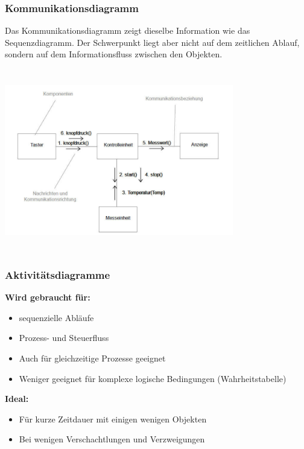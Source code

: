 \newpage
\subsubsection{Kommunikationsdiagramm}
Das Kommunikationsdiagramm zeigt dieselbe Information wie das Sequenzdiagramm. Der Schwerpunkt liegt aber
nicht auf dem zeitlichen Ablauf, sondern auf dem Informationsfluss zwischen den Objekten.

\includegraphics[height=8cm, width = 10cm,]{images/Modellierung/Kommunikationsdiagramm}


\subsubsection{Aktivitätsdiagramme}

\begin{multicols}{2}
	\textbf{Wird gebraucht für:}
	\begin{itemize}
		\item sequenzielle Abläufe
		\item Prozess- und Steuerfluss
		\item Auch für gleichzeitige Prozesse geeignet
		\item Weniger geeignet für komplexe logische Bedingungen (Wahrheitstabelle)
	\end{itemize}
	\columnbreak
	
	\textbf{Ideal:}
	\begin{itemize}
		\item Für kurze Zeitdauer mit einigen wenigen Objekten
		\item Bei wenigen Verschachtlungen und Verzweigungen
	\end{itemize}
\end{multicols}

